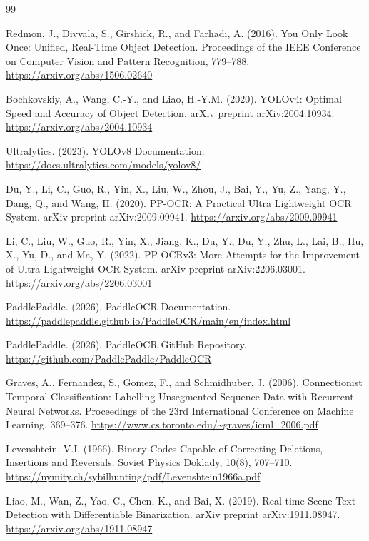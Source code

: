 \documentclass[13pt,a4paper]{report}
\begin{document}
\begin{thebibliography}{99}
	
	Redmon, J., Divvala, S., Girshick, R., and Farhadi, A. (2016). You Only Look Once: Unified, Real-Time Object Detection. Proceedings of the IEEE Conference on Computer Vision and Pattern Recognition, 779--788. \url{https://arxiv.org/abs/1506.02640}
	
	Bochkovskiy, A., Wang, C.-Y., and Liao, H.-Y.M. (2020). YOLOv4: Optimal Speed and Accuracy of Object Detection. arXiv preprint arXiv:2004.10934. \url{https://arxiv.org/abs/2004.10934}
	
	Ultralytics. (2023). YOLOv8 Documentation. \url{https://docs.ultralytics.com/models/yolov8/}
	
	Du, Y., Li, C., Guo, R., Yin, X., Liu, W., Zhou, J., Bai, Y., Yu, Z., Yang, Y., Dang, Q., and Wang, H. (2020). PP-OCR: A Practical Ultra Lightweight OCR System. arXiv preprint arXiv:2009.09941. \url{https://arxiv.org/abs/2009.09941}
	
	Li, C., Liu, W., Guo, R., Yin, X., Jiang, K., Du, Y., Du, Y., Zhu, L., Lai, B., Hu, X., Yu, D., and Ma, Y. (2022). PP-OCRv3: More Attempts for the Improvement of Ultra Lightweight OCR System. arXiv preprint arXiv:2206.03001. \url{https://arxiv.org/abs/2206.03001}
	
	PaddlePaddle. (2026). PaddleOCR Documentation. \url{https://paddlepaddle.github.io/PaddleOCR/main/en/index.html}
	
	PaddlePaddle. (2026). PaddleOCR GitHub Repository. \url{https://github.com/PaddlePaddle/PaddleOCR}
	
	Graves, A., Fernandez, S., Gomez, F., and Schmidhuber, J. (2006). Connectionist Temporal Classification: Labelling Unsegmented Sequence Data with Recurrent Neural Networks. Proceedings of the 23rd International Conference on Machine Learning, 369--376. \url{https://www.cs.toronto.edu/~graves/icml_2006.pdf}
	
	Levenshtein, V.I. (1966). Binary Codes Capable of Correcting Deletions, Insertions and Reversals. Soviet Physics Doklady, 10(8), 707--710. \url{https://nymity.ch/sybilhunting/pdf/Levenshtein1966a.pdf}
	
	Liao, M., Wan, Z., Yao, C., Chen, K., and Bai, X. (2019). Real-time Scene Text Detection with Differentiable Binarization. arXiv preprint arXiv:1911.08947. \url{https://arxiv.org/abs/1911.08947}
	

\end{thebibliography}
\end{document}
